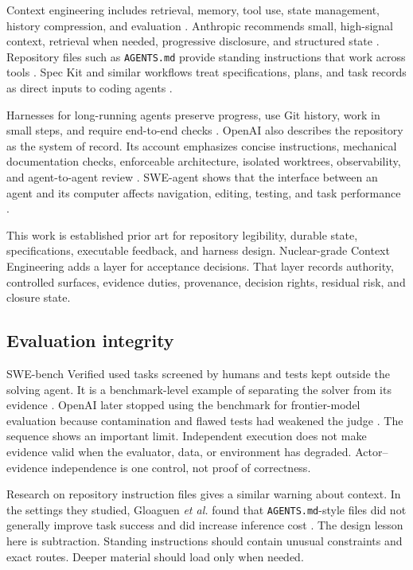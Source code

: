 \documentclass[11pt]{article}
\newcommand{\method}{Nuclear-grade Context Engineering}
\newcommand{\etal}{\textit{et al.}}
\newcommand{\code}[1]{\texttt{#1}}
\begin{document}
Context engineering includes retrieval, memory, tool use, state management, history compression, and evaluation \citep{mei2025context}. Anthropic recommends small, high-signal context, retrieval when needed, progressive disclosure, and structured state \citep{anthropic2025context}. Repository files such as \code{AGENTS.md} provide standing instructions that work across tools \citep{agentsmd2025}. Spec Kit and similar workflows treat specifications, plans, and task records as direct inputs to coding agents \citep{github2026speckit,medin2025context}.

Harnesses for long-running agents preserve progress, use Git history, work in small steps, and require end-to-end checks \citep{anthropic2025harness}. OpenAI also describes the repository as the system of record. Its account emphasizes concise instructions, mechanical documentation checks, enforceable architecture, isolated worktrees, observability, and agent-to-agent review \citep{openai2026harness}. SWE-agent shows that the interface between an agent and its computer affects navigation, editing, testing, and task performance \citep{yang2024sweagent}.

This work is established prior art for repository legibility, durable state, specifications, executable feedback, and harness design. \method{} adds a layer for acceptance decisions. That layer records authority, controlled surfaces, evidence duties, provenance, decision rights, residual risk, and closure state.

\subsection{Evaluation integrity}

SWE-bench Verified used tasks screened by humans and tests kept outside the solving agent. It is a benchmark-level example of separating the solver from its evidence \citep{openai2024swebench}. OpenAI later stopped using the benchmark for frontier-model evaluation because contamination and flawed tests had weakened the judge \citep{openai2026noswebench}. The sequence shows an important limit. Independent execution does not make evidence valid when the evaluator, data, or environment has degraded. Actor--evidence independence is one control, not proof of correctness.

Research on repository instruction files gives a similar warning about context. In the settings they studied, Gloaguen \etal{} found that \code{AGENTS.md}-style files did not generally improve task success and did increase inference cost \citep{gloaguen2026agents}. The design lesson here is subtraction. Standing instructions should contain unusual constraints and exact routes. Deeper material should load only when needed.
\end{document}
